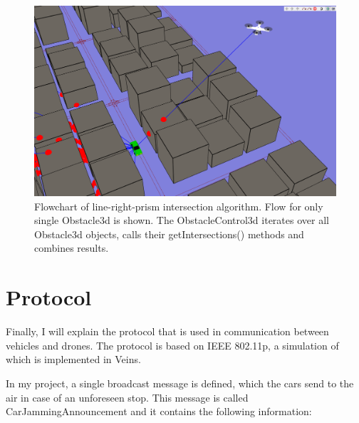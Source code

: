 \documentclass[]{nsm-thesis}
\begin{document}
\begin{figure}
	\centering
	\includegraphics[width=1\textwidth]{figures/ObstacleShadowingVisualizer.png}
	\caption{Flowchart of line-right-prism intersection algorithm. Flow for only single Obstacle3d is shown. The ObstacleControl3d iterates over all Obstacle3d objects, calls their getIntersections() methods and combines results.}
	\label{fig:ObstacleShadowingVisualizer}
\end{figure}


\section{Protocol}

Finally, I will explain the protocol that is used in communication between vehicles and drones. The protocol is based on IEEE 802.11p, a simulation of which is implemented in Veins. 

In my project, a single broadcast message is defined, which the cars send to the air in case of an unforeseen stop. This message is called CarJammingAnnouncement and it contains the following information:
\end{document}
